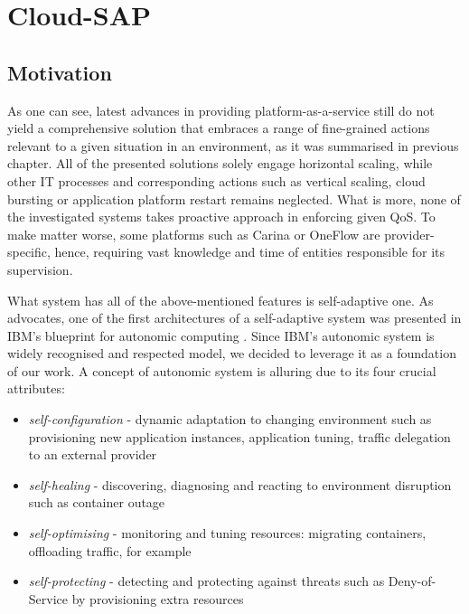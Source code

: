 \chapter{Cloud-SAP}


\section{Motivation}
As one can see, latest advances in providing platform-as-a-service still do not yield a comprehensive solution that embraces a range of fine-grained actions relevant to a given situation in an environment, as it was summarised in previous chapter. All of the presented solutions solely engage horizontal scaling, while other IT processes and corresponding actions such as vertical scaling, cloud bursting or application platform restart remains neglected. What is more, none of the investigated systems takes proactive approach in enforcing given QoS. To make matter worse, some platforms such as Carina or OneFlow are provider-specific, hence, requiring vast knowledge and time of entities responsible for its supervision.

What system has all of the above-mentioned features is self-adaptive one. As \cite{brun2009engineering} advocates, one of the first architectures of a self-adaptive system was presented in IBM's blueprint for autonomic computing \cite{IBM06}. Since IBM's autonomic system is widely recognised and respected model, we decided to leverage it as a foundation of our work. A concept of autonomic system is alluring due to its four crucial attributes:
\begin{itemize}
 \item \emph{self-configuration} - dynamic adaptation to changing environment such as provisioning new application instances, application tuning, traffic delegation to an external provider
  \item \emph{self-healing} - discovering, diagnosing and reacting to environment disruption such as container outage
  \item \emph{self-optimising} - monitoring and tuning resources: migrating containers, offloading traffic, for example
  \item \emph{self-protecting} - detecting and protecting against threats such as Deny-of-Service by provisioning extra resources
\end{itemize}

